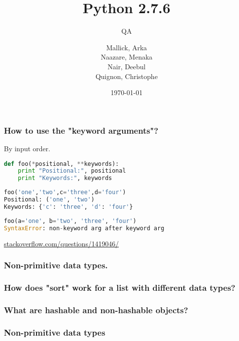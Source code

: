 \documentclass{beamer}
\begin{document}
\title{Python 2.7.6}
\subtitle{QA}
\author{
  Mallick, Arka\\
  Naazare, Menaka \\
  Nair, Deebul\\
  Quignon, Christophe \\
} 
\date{\today}

\begin{frame}
\titlepage
\end{frame}


\begin{frame}[fragile]
\frametitle{How to use the "keyword arguments"?}
By input order.
\begin{lstlisting}[language=Python]
def foo(*positional, **keywords):
    print "Positional:", positional
    print "Keywords:", keywords
\end{lstlisting}

\begin{lstlisting}[language=Python]
foo('one','two',c='three',d='four')
Positional: ('one', 'two')
Keywords: {'c': 'three', 'd': 'four'}
\end{lstlisting}
\begin{lstlisting}[language=Python]
 foo(a='one', b='two', 'three', 'four')
SyntaxError: non-keyword arg after keyword arg
\end{lstlisting}
\hbox{}
\hbox{}
\scriptsize
\hfill{}\href{http://stackoverflow.com/questions/1419046/}{stackoverflow.com/questions/1419046/}

\end{frame}


\begin{frame}[fragile]
\frametitle{Non-primitive data types.}

\end{frame}


\begin{frame}[fragile]
\frametitle{How does "sort" work for a list with different data types?}

\end{frame}


\begin{frame}[fragile]
\frametitle{What are hashable and non-hashable objects?}

\end{frame}

\begin{frame}[fragile]
\frametitle{Non-primitive data types}
\end{frame}
\end{document}
